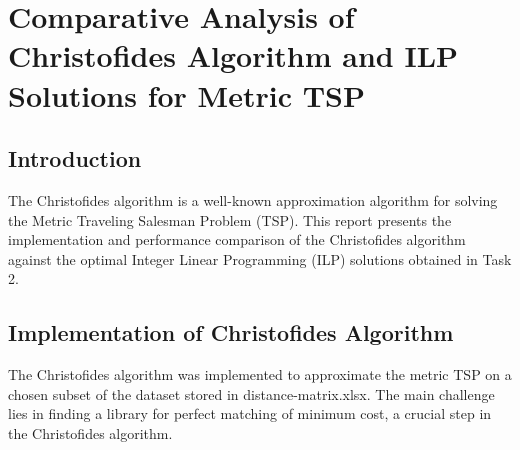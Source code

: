 \chapter{Comparative Analysis of Christofides Algorithm and ILP Solutions for Metric TSP}
\section*{Introduction}
The Christofides algorithm is a well-known approximation algorithm for solving the Metric Traveling Salesman Problem (TSP). This report presents the implementation and performance comparison of the Christofides algorithm against the optimal Integer Linear Programming (ILP) solutions obtained in Task 2.

\section*{Implementation of Christofides Algorithm}
The Christofides algorithm was implemented to approximate the metric TSP on a chosen subset of the dataset stored in distance-matrix.xlsx. The main challenge lies in finding a library for perfect matching of minimum cost, a crucial step in the Christofides algorithm. 

